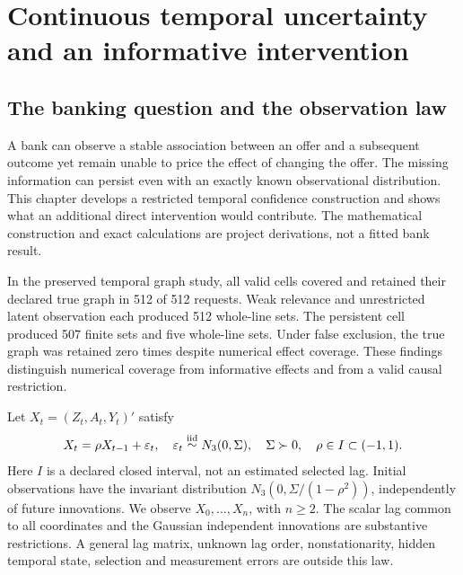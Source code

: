 \chapter{Continuous temporal uncertainty and an informative intervention}
\label{exec13:temporal-region}

\hypertarget{the-banking-question-and-the-observation-law}{%
\section{The banking question and the observation
law}\label{the-banking-question-and-the-observation-law}}

A bank can observe a stable association between an offer and a
subsequent outcome yet remain unable to price the effect of changing the
offer. The missing information can persist even with an exactly known
observational distribution. This chapter develops a restricted temporal
confidence construction and shows what an additional direct intervention
would contribute. The mathematical construction and exact calculations
are project derivations, not a fitted bank result.
\cite{exec13_temporal_argument,exec13_temporal_exact}

In the preserved temporal graph study, all valid cells covered and
retained their declared true graph in 512 of 512 requests. Weak
relevance and unrestricted latent observation each produced 512
whole-line sets. The persistent cell produced 507 finite sets and five
whole-line sets. Under false exclusion, the true graph was retained zero
times despite numerical effect coverage. These findings distinguish
numerical coverage from informative effects and from a valid causal
restriction. \cite{exec13_temporal_predecessor}

Let \(X_t=(Z_t,A_t,Y_t)'\) satisfy \[
 X_t=\rho X_{t-1}+\varepsilon_t,\quad
 \varepsilon_t\mathrel{\mathop\sim^{\rm iid}}N_3(0,\Sigma),\quad
 \Sigma\succ0,\quad \rho\in I\subset(-1,1).
\] Here \(I\) is a declared closed interval, not an estimated selected
lag. Initial observations have the invariant distribution
\(N_3(0,\Sigma/(1-\rho^2))\), independently of future innovations. We
observe \(X_0,\ldots,X_n\), with \(n\ge2\). The scalar lag common to all
coordinates and the Gaussian independent innovations are substantive
restrictions. A general lag matrix, unknown lag order, nonstationarity,
hidden temporal state, selection and measurement errors are outside this
law.

